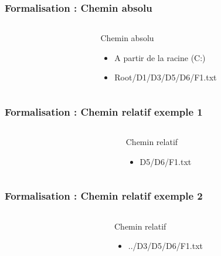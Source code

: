\documentclass{beamer}
\begin{document}
\begin{frame}
		\frametitle{Formalisation : Chemin absolu}
		\begin{columns}
			\begin{column}[l]{5cm}
				
			\end{column}
			\begin{column}[r]{5cm}
				\begin{block}{Chemin absolu}
					\begin{itemize}
						\item A partir de la racine (C:)
						\item Root/D1/D3/D5/D6/F1.txt
					\end{itemize}
				\end{block}
			\end{column}
		\end{columns}
\end{frame}

\begin{frame}
		\frametitle{Formalisation : Chemin relatif exemple 1}
		\begin{columns}
			\begin{column}[l]{5cm}
				
			\end{column}
			\begin{column}[r]{5cm}
				\begin{block}{Chemin relatif}
					\begin{itemize}
						\item D5/D6/F1.txt
					\end{itemize}
				\end{block}
			\end{column}
		\end{columns}
\end{frame}

\begin{frame}
		\frametitle{Formalisation : Chemin relatif exemple 2}
		\begin{columns}
			\begin{column}[l]{5cm}
				
			\end{column}
			\begin{column}[r]{5cm}
				\begin{block}{Chemin relatif}
					\begin{itemize}
						\item ../D3/D5/D6/F1.txt
					\end{itemize}
				\end{block}
			\end{column}
		\end{columns}
\end{frame}
\end{document}
